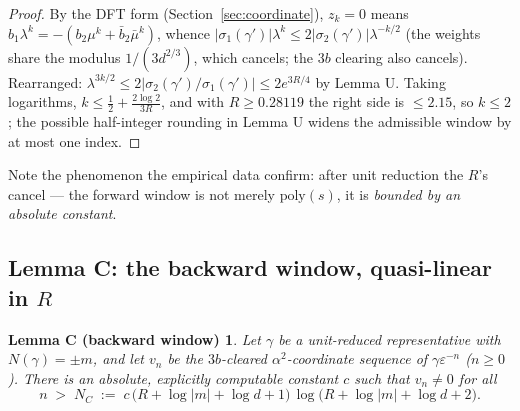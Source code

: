 \documentclass[11pt]{amsart}
\theoremstyle{plain}
\newtheorem*{lemmaC}{Lemma C (backward window)}
\theoremstyle{remark}
\begin{document}
\begin{proof}
By the DFT form (Section~\ref{sec:coordinate}), $z_k = 0$ means
$b_1\lambda^k = -(b_2\mu^k + \bar b_2\bar\mu^k)$, whence
$|\sigma_1(\gamma')|\lambda^k \le 2|\sigma_2(\gamma')|\lambda^{-k/2}$
(the weights share the modulus $1/(3d^{2/3})$, which cancels; the
$3b$ clearing also cancels). Rearranged: $\lambda^{3k/2} \le
2|\sigma_2(\gamma')/\sigma_1(\gamma')| \le 2e^{3R/4}$ by Lemma U.
Taking logarithms, $k \le \tfrac12 + \tfrac{2\log 2}{3R}$, and with
$R \ge 0.28119$ the right side is $\le 2.15$, so $k \le 2$; the
possible half-integer rounding in Lemma U widens the admissible
window by at most one index.
\end{proof}

Note the phenomenon the empirical data confirm: after unit reduction
the $R$'s cancel --- the forward window
is not merely $\mathrm{poly}(s)$, it is \emph{bounded by an absolute
constant}.

\subsection{Lemma C: the backward window, quasi-linear in $R$}
\label{sec:lemC}

\begin{lemmaC}
Let $\gamma$ be a unit-reduced representative with
$N(\gamma) = \pm m$, and let $v_n$ be the $3b$-cleared
$\alpha^2$-coordinate sequence of $\gamma\varepsilon^{-n}$
($n \ge 0$). There is an absolute, explicitly computable constant $c$
such that $v_n \ne 0$ for all
\[
n \;>\; N_C \;:=\; c\,\bigl(R + \log|m| + \log d + 1\bigr)\,
\log\bigl(R + \log|m| + \log d + 2\bigr).
\]
\end{lemmaC}
\end{document}
